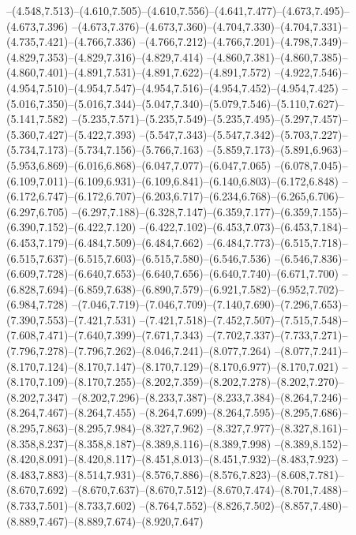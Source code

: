   --(4.548,7.513)--(4.610,7.505)--(4.610,7.556)--(4.641,7.477)--(4.673,7.495)--(4.673,7.396)%
  --(4.673,7.376)--(4.673,7.360)--(4.704,7.330)--(4.704,7.331)--(4.735,7.421)--(4.766,7.336)%
  --(4.766,7.212)--(4.766,7.201)--(4.798,7.349)--(4.829,7.353)--(4.829,7.316)--(4.829,7.414)%
  --(4.860,7.381)--(4.860,7.385)--(4.860,7.401)--(4.891,7.531)--(4.891,7.622)--(4.891,7.572)%
  --(4.922,7.546)--(4.954,7.510)--(4.954,7.547)--(4.954,7.516)--(4.954,7.452)--(4.954,7.425)%
  --(5.016,7.350)--(5.016,7.344)--(5.047,7.340)--(5.079,7.546)--(5.110,7.627)--(5.141,7.582)%
  --(5.235,7.571)--(5.235,7.549)--(5.235,7.495)--(5.297,7.457)--(5.360,7.427)--(5.422,7.393)%
  --(5.547,7.343)--(5.547,7.342)--(5.703,7.227)--(5.734,7.173)--(5.734,7.156)--(5.766,7.163)%
  --(5.859,7.173)--(5.891,6.963)--(5.953,6.869)--(6.016,6.868)--(6.047,7.077)--(6.047,7.065)%
  --(6.078,7.045)--(6.109,7.011)--(6.109,6.931)--(6.109,6.841)--(6.140,6.803)--(6.172,6.848)%
  --(6.172,6.747)--(6.172,6.707)--(6.203,6.717)--(6.234,6.768)--(6.265,6.706)--(6.297,6.705)%
  --(6.297,7.188)--(6.328,7.147)--(6.359,7.177)--(6.359,7.155)--(6.390,7.152)--(6.422,7.120)%
  --(6.422,7.102)--(6.453,7.073)--(6.453,7.184)--(6.453,7.179)--(6.484,7.509)--(6.484,7.662)%
  --(6.484,7.773)--(6.515,7.718)--(6.515,7.637)--(6.515,7.603)--(6.515,7.580)--(6.546,7.536)%
  --(6.546,7.836)--(6.609,7.728)--(6.640,7.653)--(6.640,7.656)--(6.640,7.740)--(6.671,7.700)%
  --(6.828,7.694)--(6.859,7.638)--(6.890,7.579)--(6.921,7.582)--(6.952,7.702)--(6.984,7.728)%
  --(7.046,7.719)--(7.046,7.709)--(7.140,7.690)--(7.296,7.653)--(7.390,7.553)--(7.421,7.531)%
  --(7.421,7.518)--(7.452,7.507)--(7.515,7.548)--(7.608,7.471)--(7.640,7.399)--(7.671,7.343)%
  --(7.702,7.337)--(7.733,7.271)--(7.796,7.278)--(7.796,7.262)--(8.046,7.241)--(8.077,7.264)%
  --(8.077,7.241)--(8.170,7.124)--(8.170,7.147)--(8.170,7.129)--(8.170,6.977)--(8.170,7.021)%
  --(8.170,7.109)--(8.170,7.255)--(8.202,7.359)--(8.202,7.278)--(8.202,7.270)--(8.202,7.347)%
  --(8.202,7.296)--(8.233,7.387)--(8.233,7.384)--(8.264,7.246)--(8.264,7.467)--(8.264,7.455)%
  --(8.264,7.699)--(8.264,7.595)--(8.295,7.686)--(8.295,7.863)--(8.295,7.984)--(8.327,7.962)%
  --(8.327,7.977)--(8.327,8.161)--(8.358,8.237)--(8.358,8.187)--(8.389,8.116)--(8.389,7.998)%
  --(8.389,8.152)--(8.420,8.091)--(8.420,8.117)--(8.451,8.013)--(8.451,7.932)--(8.483,7.923)%
  --(8.483,7.883)--(8.514,7.931)--(8.576,7.886)--(8.576,7.823)--(8.608,7.781)--(8.670,7.692)%
  --(8.670,7.637)--(8.670,7.512)--(8.670,7.474)--(8.701,7.488)--(8.733,7.501)--(8.733,7.602)%
  --(8.764,7.552)--(8.826,7.502)--(8.857,7.480)--(8.889,7.467)--(8.889,7.674)--(8.920,7.647)%
